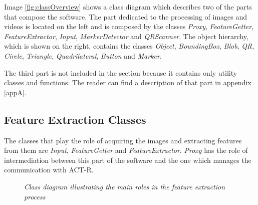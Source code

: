 		Image \ref{fig:classOverview} shows a class diagram which describes two of the parts that compose the software. 
		The part dedicated to the processing of images and videos is located on the left and is composed by the classes \emph{Proxy}, \emph{FeatureGetter}, \emph{FeatureExtractor}, \emph{Input}, \emph{MarkerDetector} and \emph{QRScanner}.
		The object hierarchy, which is shown on the right, contains the classes \emph{Object}, \emph{BoundingBox}, \emph{Blob}, \emph{QR}, \emph{Circle}, \emph{Triangle}, \emph{Quadrilateral}, \emph{Button} and \emph{Marker}.

		The third part is not included in the section because it contains only utility classes and functions. 
		The reader can find a description of that part in appendix \ref{appA}. 


		\subsection{Feature Extraction Classes}\label{featExtraction}	
		The classes that play the role of acquiring the images and extracting features from them are \emph{Input}, \emph{FeatureGetter} and \emph{FeatureExtractor}. \emph{Proxy} has the role of intermediation between this part of the software and the one which manages the communication with \mbox{ACT-R}.

		\begin{figure}[h]
		  \begin{center} 
		  \end{center} 
		  \caption{\textit{Class diagram illustrating the main roles in the feature extraction process}}  
		  \label{fig:FeatureDesign}
	 	\end{figure}
	
